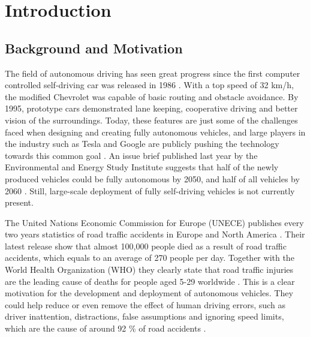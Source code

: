 \chapter{Introduction}

\section{Background and Motivation}
The field of autonomous driving has seen great progress since the first computer controlled self-driving car was released in 1986 \cite{AV-history}. With a top speed of 32 km/h, the modified Chevrolet was capable of basic routing and obstacle avoidance. By 1995, prototype cars demonstrated lane keeping, cooperative driving and better vision of the surroundings. Today, these features are just some of the challenges faced when designing and creating fully autonomous vehicles, and large players in the industry such as Tesla and Google are publicly pushing the technology towards this common goal \cite{tesla-ai-day-2022, waymo-cvpr-2022}. An issue brief published last year by the Environmental and Energy Study Institute suggests that half of the newly produced vehicles could be fully autonomous by 2050, and half of all vehicles by 2060 \cite{eesi-av-climate-solution}. Still, large-scale deployment of fully self-driving vehicles is not currently present.


The United Nations Economic Commission for Europe (UNECE) publishes every two years statistics of road traffic accidents in Europe and North America \cite{UNECE-traffic-accidents-2021}. Their latest release show that almost 100,000 people died as a result of road traffic accidents, which equals to an average of 270 people per day. Together with the World Health Organization (WHO) they clearly state that road traffic injuries are the leading cause of deaths for people aged 5-29 worldwide \cite{WHO-road-safety-report}. This is a clear motivation for the development and deployment of autonomous vehicles. They could help reduce or even remove the effect of human driving errors, such as driver inattention, distractions, false assumptions and ignoring speed limits, which are the cause of around 92 \% of road accidents \cite{towards-connected-autonomous-driving}.

